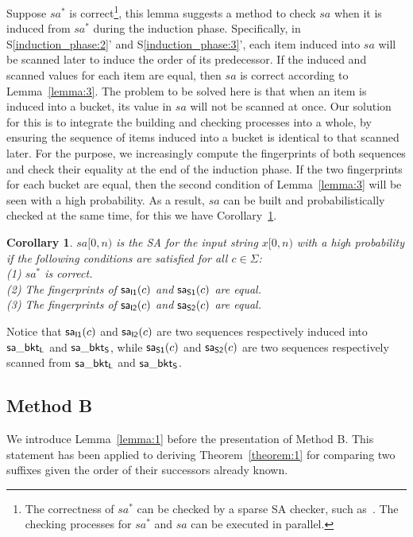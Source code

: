 \documentclass[10pt,journal,compsoc]{IEEEtran}
\newtheorem{corollary}[theorem]{Corollary}
\begin{document}
Suppose $sa^*$ is correct\footnote{The correctness of $sa^*$ can be checked by a sparse SA checker, such as~\cite{wu2017}. The checking processes for $sa^*$ and $sa$ can be executed in parallel.}, this lemma suggests a method to check $sa$ when it is induced from $sa^*$ during the induction phase. Specifically, in S\ref{induction_phase:2}' and S\ref{induction_phase:3}', each item induced into $sa$ will be scanned later to induce the order of its predecessor. If the induced and scanned values for each item are equal, then $sa$ is correct according to Lemma~\ref{lemma:3}. The problem to be solved here is that when an item is induced into a bucket, its value in $sa$ will not be scanned at once. Our solution for this is to integrate the building and checking processes into a whole, by ensuring the sequence of items induced into a bucket is identical to that scanned later. For the purpose, we increasingly compute the fingerprints of both sequences and check their equality at the end of the induction phase. If the two fingerprints for each bucket are equal, then the second condition of Lemma~\ref{lemma:3} will be seen with a high probability. As a result, $sa$ can be built and probabilistically checked at the same time, for this we have Corollary~\ref{corollary:1}.

\begin{corollary} \label{corollary:1}
	$sa[0, n)$ is the SA for the input string $x[0, n)$ with a high probability if the following conditions are satisfied for all $c \in \Sigma$: \\
	(1) $sa^*$ is correct.\\
	(2) The fingerprints of ${\sf sa_{I1}}(c)$ and ${\sf sa_{S1}}(c)$ are equal. \\
	(3) The fingerprints of ${\sf sa_{I2}}(c)$ and ${\sf sa_{S2}}(c)$ are equal. \\
	
\end{corollary}

Notice that ${\sf sa_{I1}}(c)$ and ${\sf sa_{I2}}(c)$ are two sequences respectively induced into ${\sf sa\_bkt_L}$ and ${\sf sa\_bkt_S}$, while ${\sf sa_{S1}}(c)$ and ${\sf sa_{S2}}(c)$ are two sequences respectively scanned from ${\sf sa\_bkt_L}$ and ${\sf sa\_bkt_S}$. 

\subsection{Method B}\label{sec:checkers:method_b}

We introduce Lemma~\ref{lemma:1} before the presentation of Method B. This statement has been applied to deriving Theorem~\ref{theorem:1} for comparing two suffixes given the order of their successors already known.
\end{document}
